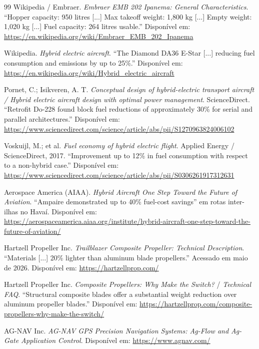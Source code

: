 \documentclass[a4paper,12pt]{article}
\begin{document}
\begin{thebibliography}{99}
    Wikipedia / Embraer. \textit{Embraer EMB 202 Ipanema: General Characteristics}. ``Hopper capacity: 950 litres [...] Max takeoff weight: 1,800 kg [...] Empty weight: 1,020 kg [...] Fuel capacity: 264 litres usable.'' Disponível em: \url{https://en.wikipedia.org/wiki/Embraer_EMB_202_Ipanema}

    Wikipedia. \textit{Hybrid electric aircraft}. ``The Diamond DA36 E-Star [...] reducing fuel consumption and emissions by up to 25\%.'' Disponível em: \url{https://en.wikipedia.org/wiki/Hybrid_electric_aircraft}

    Pornet, C.; Isikveren, A. T. \textit{Conceptual design of hybrid-electric transport aircraft / Hybrid electric aircraft design with optimal power management}. ScienceDirect. ``Retrofit Do-228 found block fuel reductions of approximately 30\% for serial and parallel architectures.'' Disponível em: \url{https://www.sciencedirect.com/science/article/abs/pii/S1270963824006102}

    Voskuijl, M.; et al. \textit{Fuel economy of hybrid electric flight}. Applied Energy / ScienceDirect, 2017. ``Improvement up to 12\% in fuel consumption with respect to a non-hybrid case.'' Disponível em: \url{https://www.sciencedirect.com/science/article/abs/pii/S0306261917312631}

    Aerospace America (AIAA). \textit{Hybrid Aircraft One Step Toward the Future of Aviation}. ``Ampaire demonstrated up to 40\% fuel-cost savings'' em rotas inter-ilhas no Havaí. Disponível em: \url{https://aerospaceamerica.aiaa.org/institute/hybrid-aircraft-one-step-toward-the-future-of-aviation/}

    Hartzell Propeller Inc. \textit{Trailblazer Composite Propeller: Technical Description}. ``Materials [...] 20\% lighter than aluminum blade propellers.'' Acessado em maio de 2026. Disponível em: \url{https://hartzellprop.com/}

    Hartzell Propeller Inc. \textit{Composite Propellers: Why Make the Switch?} / \textit{Technical FAQ}. ``Structural composite blades offer a substantial weight reduction over aluminum propeller blades.'' Disponível em: \url{https://hartzellprop.com/composite-propellers-why-make-the-switch/}

    AG-NAV Inc. \textit{AG-NAV GPS Precision Navigation Systems: Ag-Flow and Ag-Gate Application Control}. Disponível em: \url{https://www.agnav.com/}


\end{thebibliography}
\end{document}
